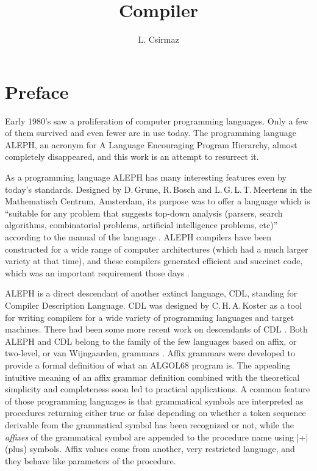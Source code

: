 \documentclass{article}
\title{{\A} Compiler}
\author{L. Csirmaz}
\date{}
\newcommand\A{\textsf{ALEPH}}
\newcommand\g[1]{\textsf{#1}}
\begin{document}
\maketitle


\section{Preface}

Early 1980's saw a proliferation of computer programming languages. Only a
few of them survived and even fewer are in use today. The programming
language \A, an acronym for {\sf A} {\sf L}anguage {\sf E}ncouraging {\sf
P}rogram {\sf H}ierarchy, almost completely disappeared, and this work is an
attempt to resurrect it.

As a programming language \A{} has many interesting features even by today's
standards. Designed by D.\,Grune, R.\,Bosch and L.\,G.\,L.\,T.\,Meertens in
the Mathematisch Centrum, Amsterdam, its purpose was to offer a language
which is ``suitable for any problem that suggests top-down analysis
(parsers, search algorithms, combinatorial problems, artificial intelligence
problems, etc)'' according to the manual of the language \cite{A-manual}.
\A{} compilers have been constructed for a wide range of computer
architectures (which had a much larger variety at that time), and these
compilers generated efficient and succinct code, which was an important
requirement those days \cite{grune}.

\A{} is a direct descendant of another extinct language, \g{CDL}, standing
for {\sf C}ompiler {\sf D}escription {\sf L}anguage. \g{CDL} was designed by
C.\,H.\,A.\,Koster \cite{koster1,koster3} as a tool for writing compilers
for a wide variety of programming languages and target machines. There had
been some more recent work on descendants of \g{CDL} \cite{cdl3}. Both
\A{} and \g{CDL} belong to the family of the few languages based on affix,
or two-level, or van Wijngaarden, grammars \cite{koster2,wijn}. Affix
grammars were developed to provide a formal definition of what an
\g{ALGOL68} program is. The appealing intuitive meaning of an affix grammar
definition combined with the theoretical simplicity and completeness soon
led to practical applications. A common feature of those programming
languages is that grammatical symbols are interpreted as procedures
returning either true or false depending on whether a token sequence
derivable from the grammatical symbol has been recognized or not, while the
\emph{affixes} of the grammatical symbol are appended to the procedure name
using \pp|+| (plus) symbols. Affix values come from another, very restricted
language, and they behave like parameters of the procedure.
\end{document}
